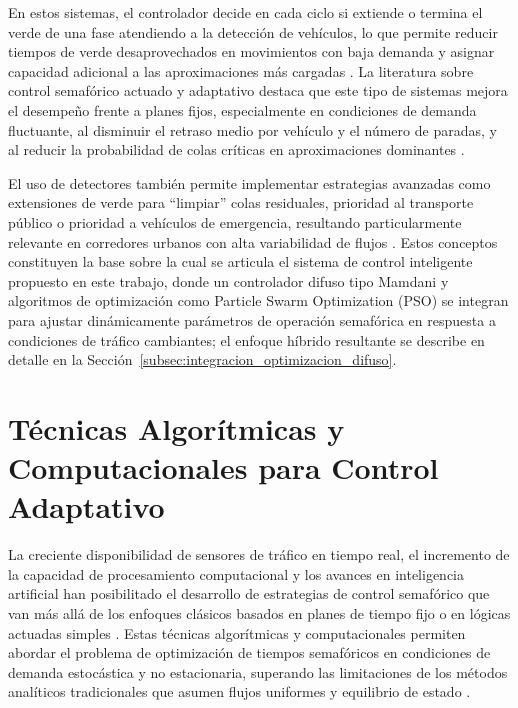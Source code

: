 En estos sistemas, el controlador decide en cada ciclo si extiende o termina el verde de una fase atendiendo a la detección de vehículos, lo que permite reducir tiempos de verde desaprovechados en movimientos con baja demanda y asignar capacidad adicional a las aproximaciones más cargadas \cite{roess2019traffic,papageorgiou2003review}. La literatura sobre control semafórico actuado y adaptativo destaca que este tipo de sistemas mejora el desempeño frente a planes fijos, especialmente en condiciones de demanda fluctuante, al disminuir el retraso medio por vehículo y el número de paradas, y al reducir la probabilidad de colas críticas en aproximaciones dominantes \cite{papageorgiou2003review,stevanovic2010adaptive}. 

El uso de detectores también permite implementar estrategias avanzadas como extensiones de verde para “limpiar” colas residuales, prioridad al transporte público o prioridad a vehículos de emergencia, resultando particularmente relevante en corredores urbanos con alta variabilidad de flujos \cite{papageorgiou2003review,gartner2001arterial}. Estos conceptos constituyen la base sobre la cual se articula el sistema de control inteligente propuesto en este trabajo, donde un controlador difuso tipo Mamdani y algoritmos de optimización como Particle Swarm Optimization (PSO) se integran para ajustar dinámicamente parámetros de operación semafórica en respuesta a condiciones de tráfico cambiantes; el enfoque híbrido resultante se describe en detalle en la Sección~\ref{subsec:integracion_optimizacion_difuso}.




\section{Técnicas Algorítmicas y Computacionales para Control Adaptativo}
\label{subsec:tecnicas_algoritmicas}

La creciente disponibilidad de sensores de tráfico en tiempo real, el incremento de la capacidad de procesamiento computacional y los avances en inteligencia artificial han posibilitado el desarrollo de estrategias de control semafórico que van más allá de los enfoques clásicos basados en planes de tiempo fijo o en lógicas actuadas simples \cite{papageorgiou2003review,stevanovic2010adaptive}. Estas técnicas algorítmicas y computacionales permiten abordar el problema de optimización de tiempos semafóricos en condiciones de demanda estocástica y no estacionaria, superando las limitaciones de los métodos analíticos tradicionales que asumen flujos uniformes y equilibrio de estado \cite{papageorgiou2003review,li2016realtime}.


